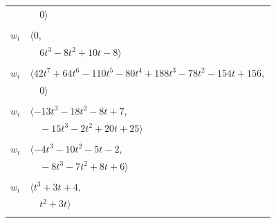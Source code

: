 \documentclass[11pt]{article}
\begin{document}
\begin{longtable}{@{}ll@{}}
 & $\quad 0\rangle$\\
\addlinespace[2pt]
\multicolumn{2}{@{}p{0.97\textwidth}@{}}{$i=14$, $D_i=1$, $\rho_{ij}$: $3{:}2, \allowbreak 5{:}2, \allowbreak 6{:}2, \allowbreak 23{:}2, \allowbreak 25{:}1, \allowbreak 26{:}2, \allowbreak 29{:}1, \allowbreak 33{:}1, \allowbreak 36{:}1$}\\
$w_i$ & $\langle 0,$\\
 & $\quad 6t^{3}-8t^{2}+10t-8\rangle$\\
\addlinespace[2pt]
\multicolumn{2}{@{}p{0.97\textwidth}@{}}{$i=15$, $D_i=1$, $\rho_{ij}$: $3{:}1, \allowbreak 4{:}2, \allowbreak 5{:}1, \allowbreak 7{:}2, \allowbreak 9{:}2, \allowbreak 12{:}2, \allowbreak 17{:}1, \allowbreak 18{:}2, \allowbreak 22{:}1, \allowbreak 23{:}2, \allowbreak 26{:}2, \allowbreak 27{:}2, \allowbreak 30{:}1, \allowbreak 31{:}1, \allowbreak 32{:}2$}\\
$w_i$ & $\langle 42t^{7}+64t^{6}-110t^{5}-80t^{4}+188t^{3}-78t^{2}-154t+156,$\\
 & $\quad 0\rangle$\\
\addlinespace[2pt]
\multicolumn{2}{@{}p{0.97\textwidth}@{}}{$i=16$, $D_i=1$, $\rho_{ij}$: $0{:}1, \allowbreak 1{:}2, \allowbreak 2{:}1, \allowbreak 12{:}2, \allowbreak 26{:}2, \allowbreak 28{:}2, \allowbreak 29{:}1, \allowbreak 33{:}2, \allowbreak 34{:}1$}\\
$w_i$ & $\langle -13t^{3}-18t^{2}-8t+7,$\\
 & $\quad -15t^{3}-2t^{2}+20t+25\rangle$\\
\addlinespace[2pt]
\multicolumn{2}{@{}p{0.97\textwidth}@{}}{$i=17$, $D_i=1$, $\rho_{ij}$: $1{:}2, \allowbreak 2{:}2, \allowbreak 4{:}1, \allowbreak 10{:}1, \allowbreak 15{:}2, \allowbreak 20{:}2, \allowbreak 35{:}2$}\\
$w_i$ & $\langle -4t^{3}-10t^{2}-5t-2,$\\
 & $\quad -8t^{3}-7t^{2}+8t+6\rangle$\\
\addlinespace[2pt]
\multicolumn{2}{@{}p{0.97\textwidth}@{}}{$i=18$, $D_i=1$, $\rho_{ij}$: $2{:}2, \allowbreak 4{:}2, \allowbreak 9{:}2, \allowbreak 15{:}1, \allowbreak 27{:}2, \allowbreak 30{:}1, \allowbreak 36{:}1$}\\
$w_i$ & $\langle t^{3}+3t+4,$\\
 & $\quad t^{2}+3t\rangle$\\
\addlinespace[2pt]
\multicolumn{2}{@{}p{0.97\textwidth}@{}}{$i=19$, $D_i=1$, $\rho_{ij}$: $8{:}1, \allowbreak 10{:}1, \allowbreak 25{:}1, \allowbreak 28{:}1, \allowbreak 35{:}2$}\\

\end{longtable}
\end{document}
